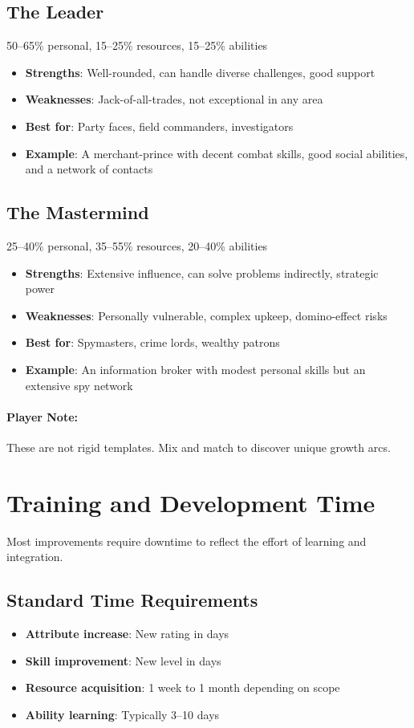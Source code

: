 \subsection*{The Leader}
50–65\% personal, 15–25\% resources, 15–25\% abilities
\begin{itemize}
\item \textbf{Strengths}: Well-rounded, can handle diverse challenges, good support
\item \textbf{Weaknesses}: Jack-of-all-trades, not exceptional in any area
\item \textbf{Best for}: Party faces, field commanders, investigators
\item \textbf{Example}: A merchant-prince with decent combat skills, good social abilities, and a network of contacts
\end{itemize}

\subsection*{The Mastermind}
25–40\% personal, 35–55\% resources, 20–40\% abilities
\begin{itemize}
\item \textbf{Strengths}: Extensive influence, can solve problems indirectly, strategic power
\item \textbf{Weaknesses}: Personally vulnerable, complex upkeep, domino-effect risks
\item \textbf{Best for}: Spymasters, crime lords, wealthy patrons
\item \textbf{Example}: An information broker with modest personal skills but an extensive spy network
\end{itemize}

\paragraph{Player Note:} These are not rigid templates. Mix and match to discover unique growth arcs.

\section{Training and Development Time}

Most improvements require downtime to reflect the effort of learning and integration.

\subsection*{Standard Time Requirements}
\begin{itemize}
\item \textbf{Attribute increase}: New rating in days
\item \textbf{Skill improvement}: New level in days
\item \textbf{Resource acquisition}: 1 week to 1 month depending on scope
\item \textbf{Ability learning}: Typically 3–10 days
\end{itemize}

